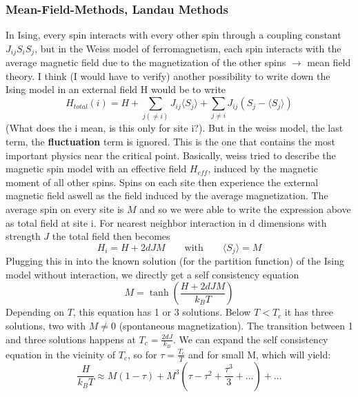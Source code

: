 	\subsubsection{Mean-Field-Methods, Landau Methods}
	In Ising, every spin interacts with every other spin through a coupling constant $J_{ij}S_iS_j$, but in the Weiss model of ferromagnetism, each spin interacts with the average magnetic field due to the magnetization of the other spins $\rightarrow$ mean field theory. I think (I would have to verify) another possibility to write down the Ising model in an external field H would be to write
	\begin{equation}
		H_{total}(i) =	H + \sum_{j (\neq i)} J_{ij} \langle S_j \rangle  + \sum_{j\neq i} J_{ij} (S_j - \langle S_j \rangle)
	\end{equation}
	(What does the i mean, is this only for site i?).
	But in the weiss model, the last term, the \textbf{fluctuation} term is ignored. This is the one that contains the most important physics near the critical point. Basically, weiss tried to describe the magnetic spin model with an effective field $H_{eff}$, induced by the magnetic moment of all other spins. Spins on each site then experience the external magnetic field aswell as the field induced by the average magnetization. The average spin on every site is $M$ and so we were able to write the expression above as total field at site i. For nearest neighbor interaction in d dimensions with strength $J$ the total field then becomes
	\begin{equation}
		H_i =	H + 2dJM \qquad \text{with} \qquad \langle S_j \rangle = M
	\end{equation}
	Plugging this in into the known solution (for the partition function) of the Ising model without interaction, we directly get a self consistency equation
	\begin{equation}
		M	=	\tanh\left(\frac{H + 2dJM}{k_BT}\right)
	\end{equation}
	Depending on $T$, this equation has 1 or 3 solutions. Below $T < T_c$ it has three solutions, two with $M	\neq 0$ (spontaneous magnetization). The transition between 1 and three solutions happens at $T_c =	\frac{2dJ}{k_B}$. We can expand the self consistency equation in the vicinity of $T_c$, so for $\tau =	\frac{T_c}{T}$ and for small M, which will yield:
	\begin{equation}
		\frac{H}{k_B T} \approx M (1 - \tau) + M^3\left(\tau - \tau^2 + \frac{\tau^3}{3} + ...\right) +...
	\end{equation}
